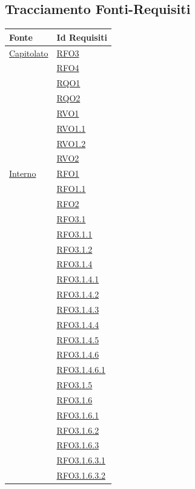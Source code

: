\subsection{Tracciamento Fonti-Requisiti}
\normalsize
\begin{longtable}{|>{\centering}m{5cm}|m{5cm}<{\centering}|}
\hline 
\textbf{Fonte} & \textbf{Id Requisiti}\\
\hline
\endhead
\hyperlink{Capitolato}{Capitolato} & \hyperlink{RFO3}{RFO3}\\
& \hyperlink{RFO4}{RFO4}\\
& \hyperlink{RQO1}{RQO1}\\
& \hyperlink{RQO2}{RQO2}\\
& \hyperlink{RVO1}{RVO1}\\
& \hyperlink{RVO1.1}{RVO1.1}\\
& \hyperlink{RVO1.2}{RVO1.2}\\
& \hyperlink{RVO2}{RVO2}\\ \hline
\hyperlink{Interno}{Interno} & \hyperlink{RFO1}{RFO1}\\
& \hyperlink{RFO1.1}{RFO1.1}\\
& \hyperlink{RFO2}{RFO2}\\
& \hyperlink{RFO3.1}{RFO3.1}\\
& \hyperlink{RFO3.1.1}{RFO3.1.1}\\
& \hyperlink{RFO3.1.2}{RFO3.1.2}\\
& \hyperlink{RFO3.1.4}{RFO3.1.4}\\
& \hyperlink{RFO3.1.4.1}{RFO3.1.4.1}\\
& \hyperlink{RFO3.1.4.2}{RFO3.1.4.2}\\
& \hyperlink{RFO3.1.4.3}{RFO3.1.4.3}\\
& \hyperlink{RFO3.1.4.4}{RFO3.1.4.4}\\
& \hyperlink{RFO3.1.4.5}{RFO3.1.4.5}\\
& \hyperlink{RFO3.1.4.6}{RFO3.1.4.6}\\
& \hyperlink{RFO3.1.4.6.1}{RFO3.1.4.6.1}\\
& \hyperlink{RFO3.1.5}{RFO3.1.5}\\
& \hyperlink{RFO3.1.6}{RFO3.1.6}\\
& \hyperlink{RFO3.1.6.1}{RFO3.1.6.1}\\
& \hyperlink{RFO3.1.6.2}{RFO3.1.6.2}\\
& \hyperlink{RFO3.1.6.3}{RFO3.1.6.3}\\
& \hyperlink{RFO3.1.6.3.1}{RFO3.1.6.3.1}\\
& \hyperlink{RFO3.1.6.3.2}{RFO3.1.6.3.2}\\

\end{longtable}
